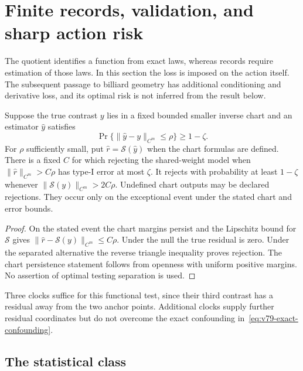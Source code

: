 \section{Finite records, validation, and sharp action risk}
\label{sec:v79-statistics}

The quotient identifies a function from exact laws, whereas records
require estimation of those laws.  In this section the loss is imposed
on the action itself.  The subsequent passage to billiard geometry has
additional conditioning and derivative loss, and its optimal risk is
not inferred from the result below.

\begin{proposition}
\label{prop:v79-test}
Suppose the true contrast $y$ lies in a fixed bounded smaller inverse
chart and an estimator $\widehat y$ satisfies
\[
 \Pr\{\|\widehat y-y\|_{C^m}\le\rho\}\ge1-\zeta.
\]
For $\rho$ sufficiently small, put
$\widehat r=\mathcal S(\widehat y)$ when the chart formulas are defined.
There is a fixed $C$ for which rejecting the shared-weight model when
$\|\widehat r\|_{C^m}>C\rho$ has type-I error at most $\zeta$.
It rejects with probability at least $1-\zeta$ whenever
$\|\mathcal S(y)\|_{C^m}>2C\rho$.
Undefined chart outputs may be declared rejections.  They occur only
on the exceptional event under the stated chart and error bounds.
\end{proposition}
\begin{proof}
On the stated event the chart margins persist and the Lipschitz bound
for $\mathcal S$ gives
$\|\widehat r-\mathcal S(y)\|_{C^m}\le C\rho$.
Under the null the true residual is zero.  Under the separated
alternative the reverse triangle inequality proves rejection.
The chart persistence statement follows from openness with uniform
positive margins.  No assertion of optimal testing separation is used.
\end{proof}

Three clocks suffice for this functional test, since their third
contrast has a residual away from the two anchor points.  Additional
clocks supply further residual coordinates but do not overcome the
exact confounding in~\eqref{eq:v79-exact-confounding}.

\subsection{The statistical class}

